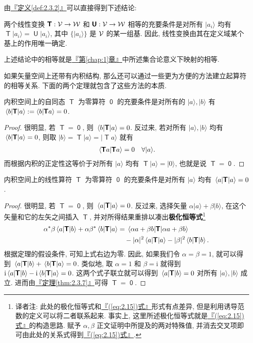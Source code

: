 \documentclass[lang=cn,zihao=-4,twoside,fontset=none]{textbook}
\newcommand{\bsf}[1]{{\mathop{\pmb{\mathsf{#1}}}}}
\def\eq#1{\[\begin{aligned}{}#1\end{aligned}\]}
\renewcommand{\eqref}[1]{\hyperref[#1]{『\textnormal{(\ref*{#1})}式』}}
\newcommand{\chapref}[1]{\hyperref[#1]{『第\textnormal{\ref*{#1}}章』}}
\newcommand{\thmref}[1]{\hyperref[#1]{『定理\textnormal{\ref*{#1}}』}}
\newcommand{\defref}[1]{\hyperref[#1]{『定义\textnormal{\ref*{#1}}』}}
\newcommand{\set}[1]{\{#1\}}
\newcommand{\ii}{{\mathrm{i}}}
\renewcommand{\ket}[1]{| #1 \rangle}
\begin{document}
由\defref{def:2.3.2}可以直接得到下述结论:
\begin{summary}
    \label{sum:2.3.6}%
    两个线性变换 $\bsf{T}:\mV\to\mW$ 和 $\bsf{U}:\mV\to\mW$ 相等的充要条件是对所有 $\ket{a_i}$ 均有 $\bsf{T}\ket{a_i}=\bsf{U}\ket{a_i}$, 其中 $\set{\ket{a_i}}$ 是 ${\mathcal V}$ 的某一组基. 因此, 线性变换由其在定义域某个基上的作用唯一确定.
\end{summary}

上述结论中的相等就是\chapref{chap:1}中所述集合论意义下映射的相等. 

如果矢量空间上还带有内积结构, 那么还可以通过一些更为方便的方法建立起算符的相等关系. 下面的两个定理就包含了这些方法的本质. 

\begin{theorem}
    \label{thm:2.3.7}%
    内积空间上的自同态 $\bsf{T}$ 为零算符 $\bsf{0}$ 的充要条件是对所有的 $\ket{a},\ket{b}$ 有 $\mel{b }{\bsf{T }}{a}:=\braket{b }{\bsf{T }a}=0$. 
\end{theorem}

\begin{proof}
    很明显, 若 $\bsf{T}=\bsf{0}$, 则 $\mel{b }{\bsf{T }}{a}=0$. 反过来, 若对所有 $\ket{a},\ket{b}$ 均有 $\mel{b }{\bsf{T }}{a}=0$, 则取 $\ket{b}=\bsf{T}\ket{a}=\ket{\bsf{T}a}$ 就有 
    \eq{
        \braket{\bsf{T}a }{\bsf{T}a}=0 \quad \forall\ket{a}.
    }
    而根据内积的正定性这等价于对所有 $\ket{a}$ 均有 $\bsf{T}\ket{a}=\ket{0}$, 也就是说 $\bsf{T}=\bsf{0}$.
\end{proof}

\begin{theorem}
    \label{thm:2.3.8}%
    内积空间上的线性算符 $\bsf{T}$ 为零算符 $\bsf{0}$ 的充要条件是对所有 $\ket{a}$ 均有 $\mel{a }{\bsf{T} }{a}=0$.
\end{theorem}
\begin{proof}
    很明显, 若 $\bsf{T}=\bsf{0}$, 则 $\mel{a }{\bsf{T}}{a}=0$. 反过来, 选择矢量 $\alpha\ket{a}+\beta\ket{b}$, 在这个矢量和它的左矢之间插入 $\bsf{T}$, 并对所得结果重排以凑出\textbf{极化恒等式}\footnote{译者注: 此处的极化恒等式和\eqref{eq:2.15}形式有点差异, 但是利用诱导范数的定义可以将二者联系起来. 事实上, 这里所述极化恒等式就是\eqref{eq:2.15}的构造思路. 赋予 $\alpha,\beta$ 正文证明中所提及的两对特殊值, 并消去交叉项即可由此处的关系式得到\eqref{eq:2.15}.}
    \eq{
        \alpha^*\beta\mel{a }{\bsf{T }}{b}+\alpha\beta^*\mel{b }{\bsf{T}}{a}&=\mel{\alpha a+\beta b }{\bsf{T }}{\alpha a+\beta b}\\
        &\quad -|\alpha|^2\mel{a }{\bsf{T}}{a}-|\beta|^2\mel{b }{\bsf T }{b}.
    }
    根据定理的假设条件, 可知上式右边为零. 因此, 如果我们令 $\alpha=\beta=1$, 就可以得到 $\mel{a }{\bsf{T}}{b}+\mel{b}{\bsf{T}}{a}=0$. 类似地, 取 $\alpha=1$ 和 $\beta=\ii$ 就得到 $\ii\mel{a}{\bsf{T}}{b}-\ii\mel{b}{\bsf T}{a}=0$. 这两个式子联立就可以得到 $\mel{a}{\bsf T}{b}=0$ 对所有 $\ket{a},\ket{b}$ 成立. 进而由\thmref{thm:2.3.7}可得 $\bsf{T}=\bsf{0}$.
\end{proof}
\end{document}

